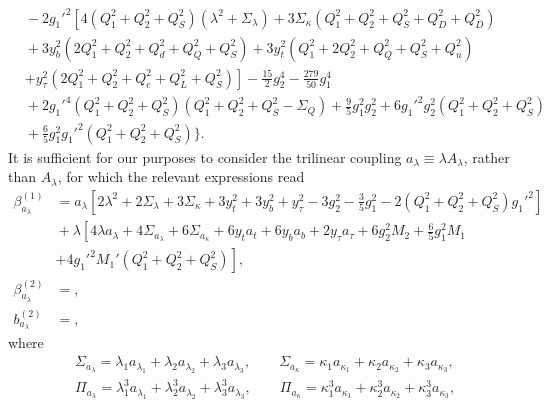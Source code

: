 \documentclass[preprint,amsmath,amssymb,aps,superscriptaddress,prd,showpacs,floatfix,nofootinbib]{revtex4-1}
\begin{document}
\begin{subequations}
\begin{align}
&{}-2g_1'^2\left [ 4\left ( Q_1^2+Q_2^2+Q_S^2\right )\left ( \lambda^2 +\Sigma_\lambda \right )+3\Sigma_\kappa\left ( Q_1^2+Q_2^2+Q_S^2+Q_D^2+Q_{\overline{D}}^2\right )\right .\nonumber\\
&{}+3y_b^2\left ( 2Q_1^2+Q_2^2+Q_d^2+Q_Q^2+Q_S^2 \right )+3y_t^2\left ( Q_1^2+2Q_2^2+Q_Q^2+Q_S^2+Q_u^2\right )\nonumber\\
&{}\left.+y_\tau^2\left ( 2Q_1^2+Q_2^2+Q_e^2+Q_L^2+Q_S^2\right )\right ]-\frac{15}{2}g_2^4-\frac{279}{50}g_1^4\nonumber\\
&{}+2g_1'^4\left ( Q_1^2+Q_2^2+Q_S^2 \right )\left (Q_1^2+Q_2^2+Q_S^2-\Sigma_{Q}\right )+\frac{9}{5}g_1^2g_2^2+6g_1'^2g_2^2\left ( Q_1^2+Q_2^2+Q_S^2\right )\nonumber\\
&{}+\frac{6}{5}g_1^2g_1'^2\left ( Q_1^2+Q_2^2+Q_S^2 \right ) \bigg \}.\label{eq:USSMLambdaOt2Coeff}
\end{align}
\end{subequations}
It is sufficient for our purposes to consider the trilinear coupling $a_\lambda\equiv \lambda A_\lambda$, rather than $A_\lambda$, for which the relevant expressions read
\begin{subequations}
\begin{align}
\beta_{a_\lambda}^{(1)}&=a_\lambda \left[2\lambda ^2+2 \Sigma_\lambda +3 \Sigma_\kappa +3 y_t^2+3 y_b^2+y_{\tau }^2-3 g_2^2-\frac{3}{5} g_1^2 -2 \left ( Q_1^2 + Q_2^2 + Q_S^2\right )g_1'^2 \right]\nonumber\\
&{}+\lambda \left [ 4\lambda a_\lambda +4\Sigma_{a_\lambda}+6\Sigma_{a_\kappa}+6y_ta_t+6y_ba_b+2y_\tau a_\tau +6g_2^2M_2+\frac{6}{5}g_1^2M_1\right.\nonumber\\
&{}\left.+4g_1'^2M_1'\left ( Q_1^2+Q_2^2+Q_S^2 \right )\right ],\label{eq:USSMTLambdaBetaOneLoop}\\
\beta_{a_\lambda}^{(2)}&=,\label{eq:USSMTLambdaBetaTwoLoop}\\
b_{a_\lambda}^{(2)}&=,\label{eq:USSMTLambdaOt2Coeff}
\end{align}
\end{subequations}
where
\begin{align*}
&\Sigma_{a_\lambda}=\lambda_1 a_{\lambda_1}+\lambda_2 a_{\lambda_2}+\lambda_3 a_{\lambda_3},\qquad \Sigma_{a_\kappa}=\kappa_1 a_{\kappa_1}+\kappa_2 a_{\kappa_2}+\kappa_3 a_{\kappa_3},\\
&\Pi_{a_\lambda}=\lambda_1^3 a_{\lambda_1}+\lambda_2^3 a_{\lambda_2}+\lambda_3^3 a_{\lambda_3},\qquad \Pi_{a_\kappa}=\kappa_1^3 a_{\kappa_1}+\kappa_2^3 a_{\kappa_2}+\kappa_3^3 a_{\kappa_3},
\end{align*}
\end{document}

